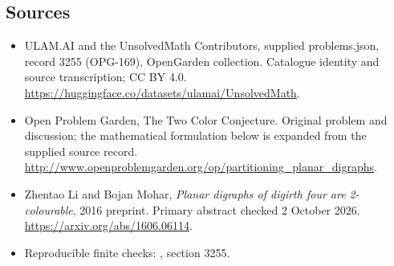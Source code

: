 \documentclass[11pt,a4paper]{article}
\begin{document}
\subsection{Sources}
\begin{itemize}
\item[S1] ULAM.AI and the UnsolvedMath Contributors, supplied problems.json, record 3255 (OPG-169), OpenGarden collection. Catalogue identity and source transcription; CC BY 4.0.
\url{https://huggingface.co/datasets/ulamai/UnsolvedMath}.
\item[S2] Open Problem Garden, The Two Color Conjecture. Original problem and discussion; the mathematical formulation below is expanded from the supplied source record.
\url{http://www.openproblemgarden.org/op/partitioning_planar_digraphs}.

\item[R1] Zhentao Li and Bojan Mohar, \emph{Planar digraphs of digirth
four are 2-colourable}, 2016 preprint. Primary abstract checked
2 October 2026. \url{https://arxiv.org/abs/1606.06114}.
\item[R2] Reproducible finite checks:
, section 3255.

\end{itemize}
\end{document}
